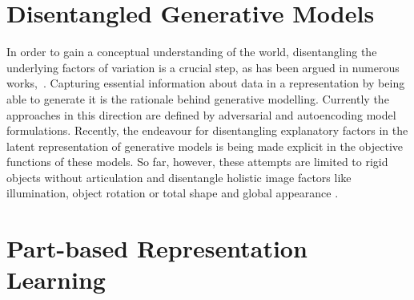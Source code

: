 \section{Disentangled Generative Models}
	In order to gain a conceptual understanding of the world, disentangling the underlying factors of variation is a crucial step, as has been argued in numerous works,~\cite{desjardins12genentangle, bengio13rep, chen16infogan, higgins16betavae, eastwood18disquantify}.
	Capturing essential information about data in a representation by being able to generate it is the rationale behind generative modelling.
	Currently the approaches in this direction are defined by adversarial \cite{goodfellow16dlb} and autoencoding \cite{kingma13vae} model formulations.
	Recently, the endeavour for disentangling explanatory factors in the latent representation of generative models is being made explicit in the objective functions \cite{burgess18betavae, chen16infogan} of these models. So far, however, these attempts are limited to rigid objects without articulation and disentangle holistic image factors like illumination, object rotation or total shape and global appearance \cite{denton17disvideo}.


\section{Part-based Representation Learning}

